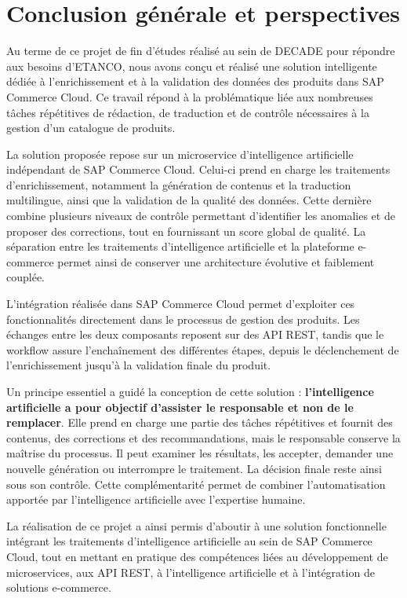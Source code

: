 \chapter*{Conclusion générale et perspectives}

Au terme de ce projet de fin d'études réalisé au sein de DECADE pour répondre aux besoins d'ETANCO, nous avons conçu et réalisé une solution intelligente dédiée à l'enrichissement et à la validation des données des produits dans SAP Commerce Cloud. Ce travail répond à la problématique liée aux nombreuses tâches répétitives de rédaction, de traduction et de contrôle nécessaires à la gestion d'un catalogue de produits.

La solution proposée repose sur un microservice d'intelligence artificielle indépendant de SAP Commerce Cloud. Celui-ci prend en charge les traitements d'enrichissement, notamment la génération de contenus et la traduction multilingue, ainsi que la validation de la qualité des données. Cette dernière combine plusieurs niveaux de contrôle permettant d'identifier les anomalies et de proposer des corrections, tout en fournissant un score global de qualité. La séparation entre les traitements d'intelligence artificielle et la plateforme e-commerce permet ainsi de conserver une architecture évolutive et faiblement couplée. 


L'intégration réalisée dans SAP Commerce Cloud permet d'exploiter ces fonctionnalités directement dans le processus de gestion des produits. Les échanges entre les deux composants reposent sur des API REST, tandis que le workflow assure l'enchaînement des différentes étapes, depuis le déclenchement de l'enrichissement jusqu'à la validation finale du produit. 

Un principe essentiel a guidé la conception de cette solution : \textbf{l'intelligence artificielle a pour objectif d'assister le responsable et non de le remplacer}. Elle prend en charge une partie des tâches répétitives et fournit des contenus, des corrections et des recommandations, mais le responsable conserve la maîtrise du processus. Il peut examiner les résultats, les accepter, demander une nouvelle génération ou interrompre le traitement. La décision finale reste ainsi sous son contrôle. Cette complémentarité permet de combiner l'automatisation apportée par l'intelligence artificielle avec l'expertise humaine.


La réalisation de ce projet a ainsi permis d'aboutir à une solution fonctionnelle intégrant les traitements d'intelligence artificielle au sein de SAP Commerce Cloud, tout en mettant en pratique des compétences liées au développement de microservices, aux API REST, à l'intelligence artificielle et à l'intégration de solutions e-commerce.

